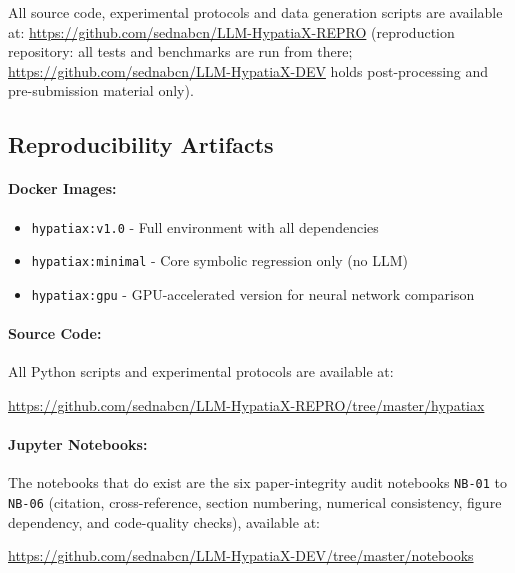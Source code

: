 \documentclass[twoside,11pt]{article}
\begin{document}
All source code, experimental protocols and data generation scripts are available at:
\url{https://github.com/sednabcn/LLM-HypatiaX-REPRO}
(reproduction repository: all tests and benchmarks are run from there;
\url{https://github.com/sednabcn/LLM-HypatiaX-DEV} holds post-processing and pre-submission material only).

\subsection{Reproducibility Artifacts}

\paragraph{Docker Images:}
\begin{itemize}
\item \texttt{hypatiax:v1.0} - Full environment with all dependencies
\item \texttt{hypatiax:minimal} - Core symbolic regression only (no LLM)
\item \texttt{hypatiax:gpu} - GPU-accelerated version for neural network comparison
\end{itemize}

\paragraph{Source Code:}
All Python scripts and experimental protocols are available at:
\begin{center}
{\small\url{https://github.com/sednabcn/LLM-HypatiaX-REPRO/tree/master/hypatiax}}
\end{center}


\paragraph{Jupyter Notebooks:}

The notebooks that do exist are the six paper-integrity audit notebooks
\texttt{NB-01} to \texttt{NB-06} (citation, cross-reference, section numbering,
numerical consistency, figure dependency, and code-quality checks), available at:
\begin{center}
{\footnotesize\url{https://github.com/sednabcn/LLM-HypatiaX-DEV/tree/master/notebooks}}
\end{center}
\end{document}
